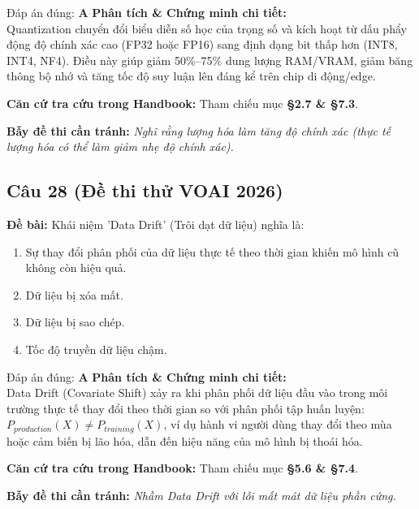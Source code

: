 \documentclass[10pt,a4paper]{article}
\begin{document}
\begin{solbox}{Đáp án đúng: \textbf{A}}
\textbf{Phân tích \& Chứng minh chi tiết:} \\
Quantization chuyển đổi biểu diễn số học của trọng số và kích hoạt từ dấu phẩy động độ chính xác cao (FP32 hoặc FP16) sang định dạng bit thấp hơn (INT8, INT4, NF4). Điều này giúp giảm 50\%–75\% dung lượng RAM/VRAM, giảm băng thông bộ nhớ và tăng tốc độ suy luận lên đáng kể trên chip di động/edge.

\vspace{0.4em}
\textbf{Căn cứ tra cứu trong Handbook:} Tham chiếu mục \textbf{§2.7 \& §7.3}.

\vspace{0.4em}
\textbf{Bẫy đề thi cần tránh:} \textit{Nghĩ rằng lượng hóa làm tăng độ chính xác (thực tế lượng hóa có thể làm giảm nhẹ độ chính xác).}
\end{solbox}
\vspace{0.5em}


\subsection*{Câu 28 (Đề thi thử VOAI 2026)}
\textbf{Đề bài:} Khái niệm 'Data Drift' (Trôi dạt dữ liệu) nghĩa là:

\begin{enumerate}[label=\textbf{\Alph*.}]
    \item Sự thay đổi phân phối của dữ liệu thực tế theo thời gian khiến mô hình cũ không còn hiệu quả.
    \item Dữ liệu bị xóa mất.
    \item Dữ liệu bị sao chép.
    \item Tốc độ truyền dữ liệu chậm.
\end{enumerate}

\begin{solbox}{Đáp án đúng: \textbf{A}}
\textbf{Phân tích \& Chứng minh chi tiết:} \\
Data Drift (Covariate Shift) xảy ra khi phân phối dữ liệu đầu vào trong môi trường thực tế thay đổi theo thời gian so với phân phối tập huấn luyện: $P_{production}(X) \neq P_{training}(X)$, ví dụ hành vi người dùng thay đổi theo mùa hoặc cảm biến bị lão hóa, dẫn đến hiệu năng của mô hình bị thoái hóa.

\vspace{0.4em}
\textbf{Căn cứ tra cứu trong Handbook:} Tham chiếu mục \textbf{§5.6 \& §7.4}.

\vspace{0.4em}
\textbf{Bẫy đề thi cần tránh:} \textit{Nhầm Data Drift với lỗi mất mát dữ liệu phần cứng.}
\end{solbox}
\vspace{0.5em}
\end{document}
